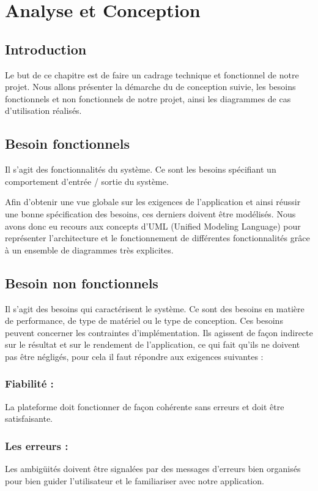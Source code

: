 \chapter{Analyse et Conception}

\section{Introduction}
Le but de ce chapitre est de faire un cadrage technique et fonctionnel de notre projet. Nous allons présenter la démarche du de conception suivie, les besoins fonctionnels et non fonctionnels de notre projet, ainsi les diagrammes de cas d'utilisation réalisés.



\section{Besoin fonctionnels}
Il s’agit des fonctionnalités du système. Ce sont les besoins spécifiant un comportement d’entrée / sortie du système.

Afin d’obtenir une vue globale sur les exigences de l’application et ainsi réussir une bonne spécification des besoins, ces derniers doivent être modélisés. Nous avons donc eu recours aux concepts d’UML (Unified Modeling Language) pour représenter l'architecture et le fonctionnement de différentes fonctionnalités grâce à un ensemble de diagrammes très explicites.

\section{Besoin non fonctionnels}
Il s’agit des besoins qui caractérisent le système. Ce sont des besoins en matière de performance, de type de matériel ou le type de conception. Ces besoins peuvent concerner les contraintes d’implémentation. Ils agissent de façon indirecte sur le résultat et sur le rendement de l’application, ce qui fait qu’ils ne doivent pas être négligés, pour cela il faut répondre aux exigences suivantes :

\subsection{Fiabilité :}
La plateforme doit fonctionner de façon cohérente sans erreurs et doit être satisfaisante.
\subsection{Les erreurs :}
Les ambigüités doivent être signalées par des messages d’erreurs bien organisés pour bien guider l’utilisateur et le familiariser avec notre application.
